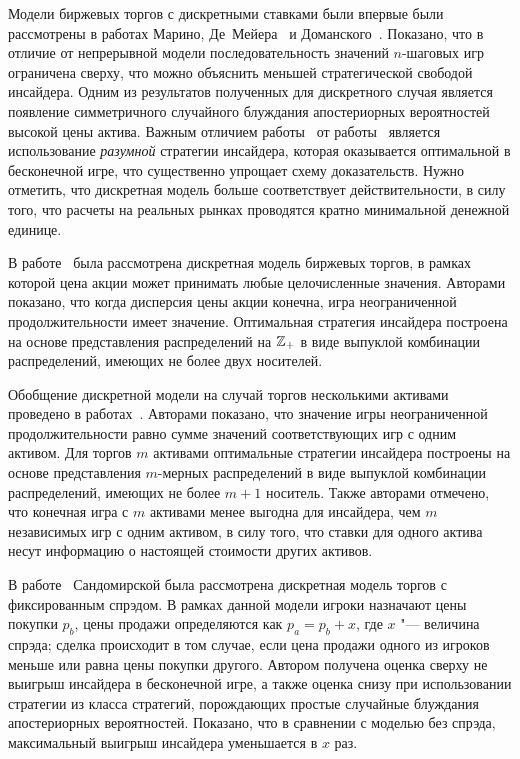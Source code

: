 Модели биржевых торгов с дискретными ставками были впервые были рассмотрены в работах Марино, Де~Мейера~\cite{demeyer05} и Доманского~\cite{domansky07}.
Показано, что в отличие от непрерывной модели последовательность значений $n$-шаговых игр ограничена сверху, что можно объяснить меньшей стратегической свободой инсайдера.
Одним из результатов полученных для дискретного случая является появление симметричного случайного блуждания апостериорных вероятностей высокой цены актива.
Важным отличием работы~\cite{domansky07} от работы~\cite{demeyer05} является использование \emph{разумной} стратегии инсайдера, которая оказывается оптимальной в бесконечной игре, что существенно упрощает схему доказательств. 
Нужно отметить, что дискретная модель больше соответствует действительности, в силу того, что расчеты на реальных рынках проводятся кратно минимальной денежной единице.

В работе~\cite{domansky11} была рассмотрена дискретная модель биржевых торгов, в рамках которой цена акции может принимать любые целочисленные значения.
Авторами показано, что когда дисперсия цены акции конечна, игра неограниченной продолжительности имеет значение.
Оптимальная стратегия инсайдера построена на основе представления распределений на $\mathbb{Z}_+$ в виде выпуклой комбинации распределений, имеющих не более двух носителей.

Обобщение дискретной модели на случай торгов несколькими активами проведено в работах~\cite{domansky13, domansky14}.
Авторами показано, что значение игры неограниченной продолжительности равно сумме значений соответствующих игр с одним активом.
Для торгов $m$ активами оптимальные стратегии инсайдера построены на основе представления $m$-мерных распределений в виде выпуклой комбинации распределений, имеющих не более $m+1$ носитель.
Также авторами отмечено, что конечная игра с $m$ активами менее выгодна для инсайдера, чем $m$ независимых игр с одним активом, в силу того, что ставки для одного актива несут информацию о настоящей стоимости других активов.

В работе~\cite{sandomirskaya14} Сандомирской была рассмотрена дискретная модель торгов с фиксированным спрэдом.
В рамках данной модели игроки назначают цены покупки $p_b$, цены продажи определяются как $p_a = p_b + x$, где $x$ "--- величина спрэда; сделка происходит в том случае, если цена продажи одного из игроков меньше или равна цены покупки другого. 
Автором получена оценка сверху не выигрыш инсайдера в бесконечной игре, а также оценка снизу при использовании стратегии из класса стратегий, порождающих простые случайные блуждания апостериорных вероятностей. 
Показано, что в сравнении с моделью без спрэда, максимальный выигрыш инсайдера уменьшается в $x$ раз.

